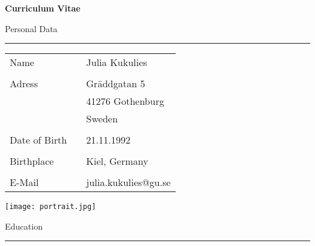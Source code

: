 \documentclass[a4paper,12pt]{article}
\begin{document}
\begin{titlepage}

\flushright\Huge\textbf{{Curriculum Vitae}}

\vspace{1.3cm}
\flushleft\large Personal Data
\\[-2ex]
\rule{1\textwidth}{0.7pt}
\smallskip

\begin{table}[h!]
\begin{subtable}[t]{10.5cm}
	\begin{tabular}{p{3.7cm}p{0.5cm}|p{12cm}}
	\small
	Name & & Julia Kukulies\\
	& &\\[-1.7ex]
	Adress & & Gr{\"a}ddgatan 5
	\\ 	& & 41276  Gothenburg\\
	& & Sweden\\
	& & \\[-1.7ex]
	Date of Birth & & 21.11.1992\\
	& & \\[-1.7ex]
	Birthplace & & Kiel, Germany\\
	& & \\[-1.7ex]
	E-Mail & & julia.kukulies@gu.se\\
	\end{tabular}
\end{subtable}
\hfill
\begin{subtable}{5.5cm}
\texttt{[image: portrait.jpg]}
\end{subtable}
\end{table}

\flushleft\large Education
\\[-2ex]
\rule{1\textwidth}{0.7pt}
\smallskip




\end{titlepage}
\end{document}
